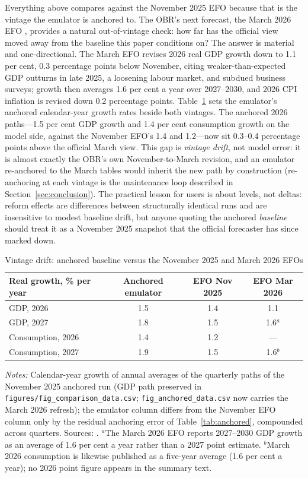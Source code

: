 Everything above compares against the November 2025 EFO because that is the vintage the emulator is anchored to. The OBR's next forecast, the March 2026 EFO \citep{obr2026efo}, provides a natural out-of-vintage check: how far has the official view moved away from the baseline this paper conditions on? The answer is material and one-directional. The March EFO revises 2026 real GDP growth down to 1.1 per cent, 0.3 percentage points below November, citing weaker-than-expected GDP outturns in late 2025, a loosening labour market, and subdued business surveys; growth then averages 1.6 per cent a year over 2027--2030, and 2026 CPI inflation is revised down 0.2 percentage points. Table~\ref{tab:vintage} sets the emulator's anchored calendar-year growth rates beside both vintages. The anchored 2026 paths---1.5 per cent GDP growth and 1.4 per cent consumption growth on the model side, against the November EFO's 1.4 and 1.2---now sit 0.3--0.4 percentage points above the official March view. This gap is \emph{vintage drift}, not model error: it is almost exactly the OBR's own November-to-March revision, and an emulator re-anchored to the March tables would inherit the new path by construction (re-anchoring at each vintage is the maintenance loop described in Section~\ref{sec:conclusion}). The practical lesson for users is about levels, not deltas: reform effects are differences between structurally identical runs and are insensitive to modest baseline drift, but anyone quoting the anchored \emph{baseline} should treat it as a November 2025 snapshot that the official forecaster has since marked down.

\begin{table}[ht]
\centering
\caption{Vintage drift: anchored baseline versus the November 2025 and March 2026 EFOs}
\label{tab:vintage}
\small
\setlength{\tabcolsep}{5pt}
\begin{tabular}{lccc}
\toprule
Real growth, \% per year & Anchored emulator & EFO Nov 2025 & EFO Mar 2026 \\
\midrule
GDP, 2026 & 1.5 & 1.4 & 1.1 \\
GDP, 2027 & 1.8 & 1.5 & 1.6$^{a}$ \\
Consumption, 2026 & 1.4 & 1.2 & --- \\
Consumption, 2027 & 1.9 & 1.5 & 1.6$^{b}$ \\
\bottomrule
\end{tabular}

\medskip
\parbox{0.92\textwidth}{\footnotesize \emph{Notes:} Calendar-year growth of annual averages of the quarterly paths of the November 2025 anchored run (GDP path preserved in \texttt{figures/fig\_comparison\_data.csv}; \texttt{fig\_anchored\_data.csv} now carries the March 2026 refresh); the emulator column differs from the November EFO column only by the residual anchoring error of Table~\ref{tab:anchored}, compounded across quarters. Sources: \citet{obr2025efo, obr2026efo}. $^{a}$The March 2026 EFO reports 2027--2030 GDP growth as an average of 1.6 per cent a year rather than a 2027 point estimate. $^{b}$March 2026 consumption is likewise published as a five-year average (1.6 per cent a year); no 2026 point figure appears in the summary text.}
\end{table}

